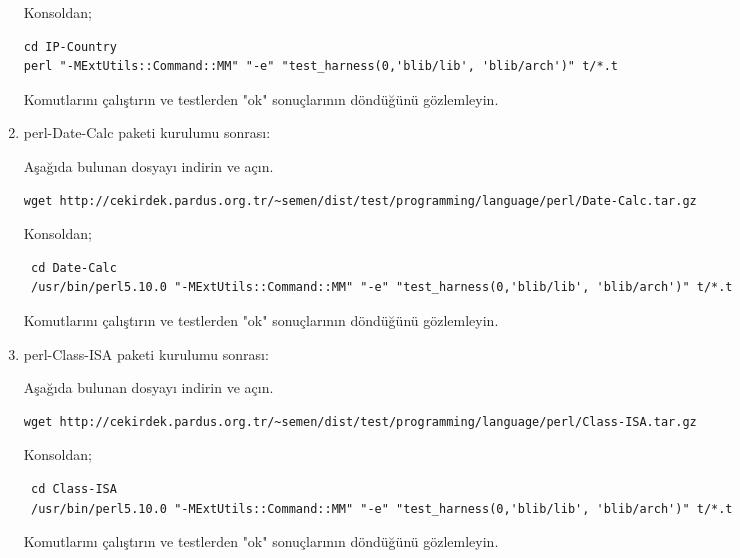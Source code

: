 \documentclass[a4paper,10pt]{article}
\begin{document}
\begin{enumerate}
Konsoldan;
\begin{verbatim}
cd IP-Country
perl "-MExtUtils::Command::MM" "-e" "test_harness(0,'blib/lib', 'blib/arch')" t/*.t
\end{verbatim}

Komutlarını çalıştırın ve testlerden "ok" sonuçlarının döndüğünü gözlemleyin.

% 
% 
% 

\item perl-Date-Calc paketi kurulumu sonrası:

Aşağıda bulunan dosyayı indirin ve açın.
\begin{verbatim}
wget http://cekirdek.pardus.org.tr/~semen/dist/test/programming/language/perl/Date-Calc.tar.gz
\end{verbatim}

Konsoldan;
\begin{verbatim}
 cd Date-Calc
 /usr/bin/perl5.10.0 "-MExtUtils::Command::MM" "-e" "test_harness(0,'blib/lib', 'blib/arch')" t/*.t
\end{verbatim}

Komutlarını çalıştırın ve testlerden "ok" sonuçlarının döndüğünü gözlemleyin.

\item perl-Class-ISA paketi kurulumu sonrası:

Aşağıda bulunan dosyayı indirin ve açın.
\begin{verbatim}
wget http://cekirdek.pardus.org.tr/~semen/dist/test/programming/language/perl/Class-ISA.tar.gz
\end{verbatim}

Konsoldan;
\begin{verbatim}
 cd Class-ISA
 /usr/bin/perl5.10.0 "-MExtUtils::Command::MM" "-e" "test_harness(0,'blib/lib', 'blib/arch')" t/*.t
\end{verbatim}

Komutlarını çalıştırın ve testlerden "ok" sonuçlarının döndüğünü gözlemleyin.


\end{enumerate}
\end{document}
